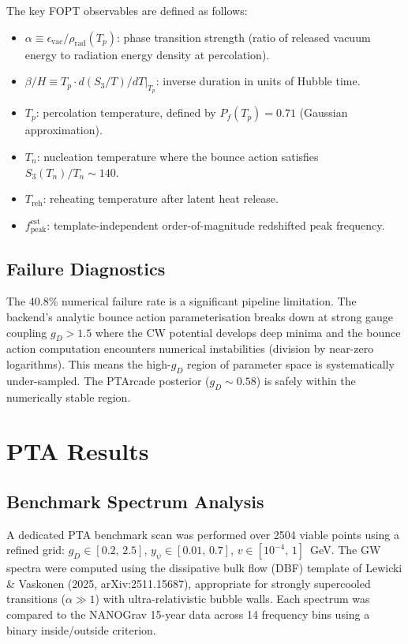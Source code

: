 \documentclass[12pt,a4paper]{article}
\begin{document}
The key FOPT observables are defined as follows:
\begin{itemize}[nosep]
\item $\alpha \equiv \epsilon_\text{vac} / \rho_\text{rad}(T_p)$: phase transition strength (ratio of released vacuum energy to radiation energy density at percolation).
\item $\beta/H \equiv T_p \cdot d(S_3/T)/dT\big|_{T_p}$: inverse duration in units of Hubble time.
\item $T_p$: percolation temperature, defined by $P_f(T_p) = 0.71$ (Gaussian approximation).
\item $T_n$: nucleation temperature where the bounce action satisfies $S_3(T_n)/T_n \sim 140$.
\item $T_\text{reh}$: reheating temperature after latent heat release.
\item $f_\text{peak}^\text{est}$: template-independent order-of-magnitude redshifted peak frequency.
\end{itemize}

\subsection{Failure Diagnostics}

The 40.8\% numerical failure rate is a significant pipeline limitation. The backend's analytic bounce action parameterisation breaks down at strong gauge coupling $g_D > 1.5$ where the CW potential develops deep minima and the bounce action computation encounters numerical instabilities (division by near-zero logarithms). This means the high-$g_D$ region of parameter space is systematically under-sampled. The PTArcade posterior ($g_D \sim 0.58$) is safely within the numerically stable region.

\section{PTA Results}
\label{sec:pta}

\subsection{Benchmark Spectrum Analysis}

A dedicated PTA benchmark scan was performed over 2504 viable points using a refined grid: $g_D \in [0.2,\,2.5]$, $y_\psi \in [0.01,\,0.7]$, $v \in [10^{-4},\,1]$~GeV. The GW spectra were computed using the dissipative bulk flow (DBF) template of Lewicki \& Vaskonen (2025, arXiv:2511.15687), appropriate for strongly supercooled transitions ($\alpha \gg 1$) with ultra-relativistic bubble walls. Each spectrum was compared to the NANOGrav 15-year data across 14 frequency bins using a binary inside/outside criterion.
\end{document}
